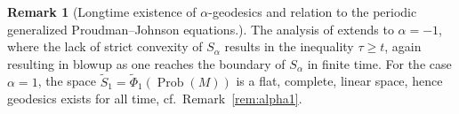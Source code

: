 \documentclass[11pt,reqno]{amsart}
\theoremstyle{definition}
\newtheorem{remark}[theorem]{Remark}
\newcommand{\Prob}{\operatorname{Prob}(M)}
\begin{document}
\begin{remark}[Longtime existence of $\alpha$-geodesics and relation to the periodic generalized Proudman--Johnson equations.]
The analysis of \cite[Theorem~4.11]{bauer2024p} extends to  $\alpha=-1$, where the lack of strict convexity of $S_\alpha$ results in the inequality $\tau\ge t$, again resulting in blowup as one reaches the boundary of $S_\alpha$ in finite time.
For the case $\alpha=1$, the space $\tilde{S}_1=\tilde{\Phi}_1(\Prob)$ is a flat, complete, linear space, hence geodesics exists for all time, cf.\ Remark~\ref{rem:alpha1}.


\end{remark}
\end{document}
